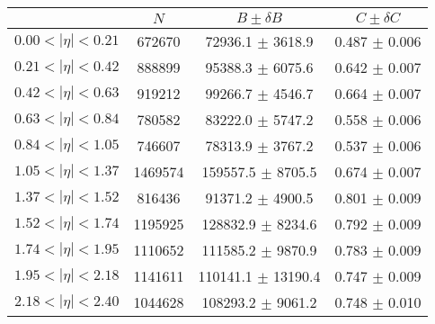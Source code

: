 \begin{tabular}{lccc}
\hline
    &   $N$   & $B \pm \delta B$  &  $C \pm \delta C$ \\
\hline
$0.00 < |\eta| <0.21$          & 672670     & 72936.1    $\pm$ 3618.9 & 0.487      $\pm$ 0.006 \\
$0.21 < |\eta| <0.42$          & 888899     & 95388.3    $\pm$ 6075.6 & 0.642      $\pm$ 0.007 \\
$0.42 < |\eta| <0.63$          & 919212     & 99266.7    $\pm$ 4546.7 & 0.664      $\pm$ 0.007 \\
$0.63 < |\eta| <0.84$          & 780582     & 83222.0    $\pm$ 5747.2 & 0.558      $\pm$ 0.006 \\
$0.84 < |\eta| <1.05$          & 746607     & 78313.9    $\pm$ 3767.2 & 0.537      $\pm$ 0.006 \\
$1.05 < |\eta| <1.37$          & 1469574    & 159557.5   $\pm$ 8705.5 & 0.674      $\pm$ 0.007 \\
$1.37 < |\eta| <1.52$          & 816436     & 91371.2    $\pm$ 4900.5 & 0.801      $\pm$ 0.009 \\
$1.52 < |\eta| <1.74$          & 1195925    & 128832.9   $\pm$ 8234.6 & 0.792      $\pm$ 0.009 \\
$1.74 < |\eta| <1.95$          & 1110652    & 111585.2   $\pm$ 9870.9 & 0.783      $\pm$ 0.009 \\
$1.95 < |\eta| <2.18$          & 1141611    & 110141.1   $\pm$ 13190.4 & 0.747      $\pm$ 0.009 \\
$2.18 < |\eta| <2.40$          & 1044628    & 108293.2   $\pm$ 9061.2 & 0.748      $\pm$ 0.010 \\
\hline
\end{tabular}
